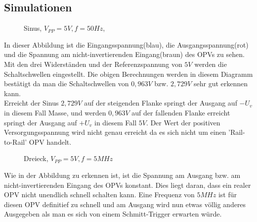 \subsection{Simulationen}
\begin{figure}[H]
  \centering
  \caption{Sinus, $V_{PP}=5V, f=50Hz$,}
\end{figure}
\noindent
In dieser Abbildung ist die Eingangsspannung(blau), die Ausgangsspannung(rot) und die Spannung am nicht-invertierenden Eingang(braun) des OPVs zu sehen. Mit den drei Widerst\"anden und der Referenzspannung von $5V$ werden die Schaltschwellen eingestellt. Die obigen Berechnungen werden in diesem Diagramm best\"atigt da man die Schaltschwellen von $0,963V$ bzw. $2,729V$ sehr gut erkennen kann. \\
Erreicht der Sinus $2,729V$ auf der steigenden Flanke springt der Ausgang auf $-U_v$ in diesem Fall Masse, und werden $0,963V$ auf der fallenden Flanke erreicht springt der Ausgang auf $+U_v$ in diesem Fall $5V$. Der Wert der positiven Versorgungsspannung wird nicht genau erreicht da es sich nicht um einen 'Rail-to-Rail' OPV handelt.

\begin{figure}[H]
  \centering
  \caption{Dreieck, $V_{PP}=5V, f=5MHz$}
\end{figure}
\noindent
Wie in der Abbildung zu erkennen ist, ist die Spannung am Ausgang bzw. am nicht-invertierenden Eingang des OPVs konstant. Dies liegt daran, dass ein realer OPV nicht unendlich schnell schalten kann. Eine Frequenz von $5MHz$ ist f\"ur diesen OPV definitief zu schnell und am Ausgang wird nun etwas v\"ollig anderes Ausgegeben als man es sich von einem Schmitt-Trigger erwarten w\"urde.
